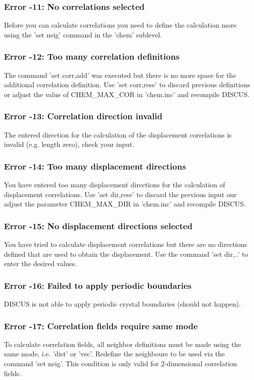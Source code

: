 \subsubsection{Error -11: No correlations selected}
\par
Before you can calculate correlations you need to define the calculation 
more using the 'set neig' command in the 'chem' sublevel. 
\subsubsection{Error -12: Too many correlation definitions}
\par
The command 'set corr,add' was executed but there is no more space 
for the additional correlation definition. Use 'set corr,rese' to 
discard previous definitions or adjust the value of CHEM\_MAX\_COR in 
'chem.inc' and recompile DISCUS. 
\subsubsection{Error -13: Correlation direction invalid}
\par
The entered direction for the calculation of the displacement correlations 
is invalid (e.g. length zero), check your input. 
\subsubsection{Error -14: Too many displacement directions}
\par
You have entered too many displacement directions for the calculation 
of displacement correlations. Use 'set dir,rese' to discard the 
previous input our adjust the parameter CHEM\_MAX\_DIR in 'chem.inc' 
and recompile DISCUS. 
\subsubsection{Error -15: No displacement directions selected}
\par
You have tried to calculate displacement correlations but there are 
no directions defined that are used to obtain the displacement. Use 
the command 'set dir,..' to enter the desired values. 
\subsubsection{Error -16: Failed to apply periodic boundaries}
\par
DISCUS is not able to apply periodic crystal boundaries (should not 
happen). 
\subsubsection{Error -17: Correlation fields require same mode}
\par
To calculate correlation fields, all neighbor definitions must be 
made using the same mode, i.e. 'dist' or 'vec'. Redefine the neighbours 
to be used via the command 'set neig'. This condition is only valid 
for 2-dimensional correlation fields. 
